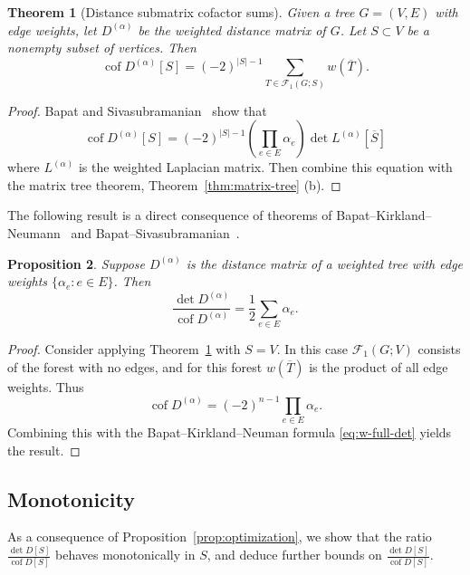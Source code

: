 \documentclass{amsart}
\newtheorem{thm}{Theorem}[section]
\newtheorem{prop}[thm]{Proposition}
\theoremstyle{definition}
\newcommand{\Da}{{D^{(\alpha)}}}
\newcommand{\La}{L^{(\alpha)}}
\DeclareMathOperator{\cof}{cof}
\newcommand{\trees}{\mathcal{F}_1}
\newcommand{\note}[1]{{\color{red} \sf $\diamondsuit$  {#1} $\diamondsuit$ }}
\begin{document}
\begin{thm}[Distance submatrix cofactor sums]
\label{thm:distance-sub-cof}
Given a tree $G = (V, E)$ with edge weights,
let $\Da$ be the weighted distance matrix of $G$.
Let $S \subset V$ be a nonempty subset of vertices. 
Then
\begin{equation}
	\cof \Da[S] = (-2)^{|S|-1} \sum_{T \in \trees(G; S)} w(\overline{T}).
\end{equation}
\end{thm}
\begin{proof}
Bapat and Sivasubramanian~\cite[Theorem 11]{bapat-sivasubramanian}
show that
\[
	\cof \Da[S] = (-2)^{|S|-1} \left( \prod_{e \in E} \alpha_e \right) \det \La[\overline S] 
\]
where $\La$ is the weighted Laplacian matrix.
Then combine this equation with the matrix tree theorem,
Theorem~\ref{thm:matrix-tree} (b).
\end{proof}

The following result is a direct consequence of theorems of Bapat--Kirkland--Neumann~\cite{bapat-kirkland-neumann} and Bapat--Sivasubramanian~\cite{bapat-sivasubramanian}.

\begin{prop}
\label{prop:full-det-cof-ratio}
Suppose $\Da$ is the distance matrix of a weighted tree with edge weights $\{\alpha_e : e \in E\}$.
Then
\[
	\frac{\det \Da}{\cof \Da} = \frac1{2} \sum_{e \in E} \alpha_e .
\]
\end{prop}
\begin{proof}
Consider applying Theorem~\ref{thm:distance-sub-cof} with $S = V$.
In this case $\trees(G; V)$ consists of the forest with no edges, and for this forest $w(\overline{T})$ is the product of all edge weights.
Thus
\[
	\cof \Da = (-2)^{n - 1} \prod_{e \in E} \alpha_e .
\]
Combining this with the Bapat--Kirkland--Neuman formula \eqref{eq:w-full-det} yields the result.
\end{proof}

\subsection{Monotonicity}

As a consequence of Proposition~\ref{prop:optimization}, we show that the ratio $\displaystyle \frac{\det D[S]}{\cof D[S]}$ behaves monotonically in $S$, and deduce further bounds on $\displaystyle \frac{\det D[S]}{\cof D[S]}$.
\end{document}
